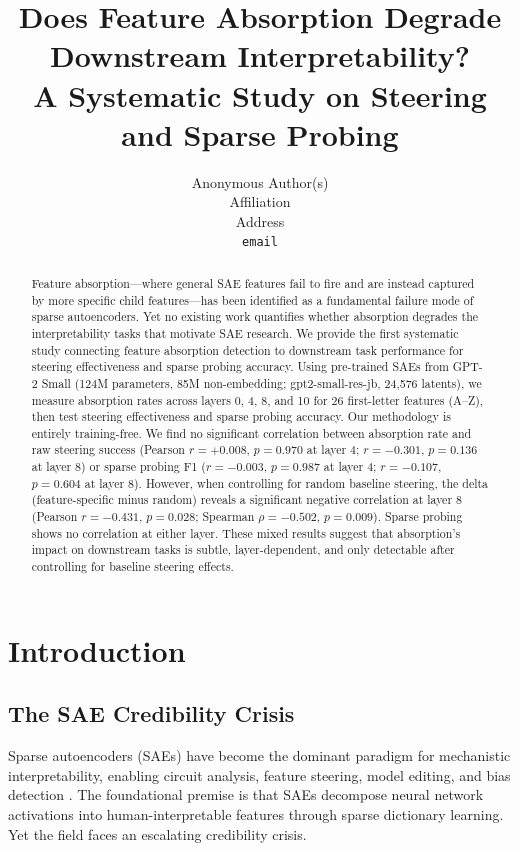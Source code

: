 \documentclass{article}
\title{Does Feature Absorption Degrade Downstream Interpretability?\\
A Systematic Study on Steering and Sparse Probing}
\author{%
  Anonymous Author(s) \\
  Affiliation \\
  Address \\
  \texttt{email} \\
}
\begin{document}
\maketitle

\begin{abstract}
Feature absorption---where general SAE features fail to fire and are instead captured by more specific child features---has been identified as a fundamental failure mode of sparse autoencoders. Yet no existing work quantifies whether absorption degrades the interpretability tasks that motivate SAE research. We provide the first systematic study connecting feature absorption detection to downstream task performance for steering effectiveness and sparse probing accuracy. Using pre-trained SAEs from GPT-2 Small (124M parameters, 85M non-embedding; gpt2-small-res-jb, 24,576 latents), we measure absorption rates across layers 0, 4, 8, and 10 for 26 first-letter features (A--Z), then test steering effectiveness and sparse probing accuracy. Our methodology is entirely training-free. We find no significant correlation between absorption rate and raw steering success (Pearson $r = +0.008$, $p = 0.970$ at layer 4; $r = -0.301$, $p = 0.136$ at layer 8) or sparse probing F1 ($r = -0.003$, $p = 0.987$ at layer 4; $r = -0.107$, $p = 0.604$ at layer 8). However, when controlling for random baseline steering, the delta (feature-specific minus random) reveals a significant negative correlation at layer 8 (Pearson $r = -0.431$, $p = 0.028$; Spearman $\rho = -0.502$, $p = 0.009$). Sparse probing shows no correlation at either layer. These mixed results suggest that absorption's impact on downstream tasks is subtle, layer-dependent, and only detectable after controlling for baseline steering effects.
\end{abstract}

\section{Introduction}
\label{sec:intro}

\subsection{The SAE Credibility Crisis}

Sparse autoencoders (SAEs) have become the dominant paradigm for mechanistic interpretability, enabling circuit analysis, feature steering, model editing, and bias detection \citep{marks2024sparse, templeton2024scaling}. The foundational premise is that SAEs decompose neural network activations into human-interpretable features through sparse dictionary learning. Yet the field faces an escalating credibility crisis.
\end{document}
